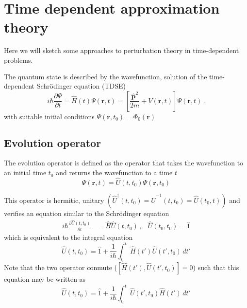 \chapter{Time dependent approximation theory}
Here we will sketch some approaches to perturbation theory in time-dependent problems.

The quantum state is described by the wavefunction, solution of the time-dependent Schr\"{o}dinger equation (TDSE)
\begin{equation}\label{Q:td-tdse}
i \hbar \frac{\partial \Psi}{\partial t} = \hat{H}(t)  \Psi(\bm{r},t)= 
 \left[ \frac{\hat{\bm{p}}^{2}}{2 m} + V(\bm{r},t) \right]  \Psi(\bm{r},t) \,.
\end{equation}
with suitable initial conditions $\Psi(\bm{r},t_{0})= \Phi_{0}(\bm{r})$ 

\section{Evolution operator}
\label{S:evolution-operator}

The evolution operator is defined as the operator that takes the wavefunction to an initial time $t_{0}$ and returns the wavefunction to a time $t$
\begin{equation} \label{Q:td-defin-evolu-operat}
  \Psi(\bm{r},t)=  \hat{U}(t,t_{0}) \Psi(\bm{r},t_{0})
\end{equation}

This operator is hermitic, unitary $\left( \hat{U}^{\dag}(t,t_{0})= \hat{U}^{-1}(t,t_{0})= \hat{U}(t_{0},t) \right)$ and verifies an equation similar to the Schr\"{o}dinger equation
\begin{align}
  \label{Q:td-diffe-equat-opera-evolu}
  i\hbar \frac{\partial \hat{U}(t,t_{0})}{\partial t}&= \hat{H} \hat{U}(t,t_{0})\,, & \hat{U}(t_{0},t_{0})= \hat{1}
\end{align}
which is equivalent to the integral equation
\begin{equation}
  \label{Q:td-diffe-equat-opera-evolu-0}
  \hat{U}(t,t_{0}) = \hat{1} + \frac{1}{i\hbar} \int_{t_{0}}^{t} \hat{H}(t') \hat{U}(t',t_{0}) \, dt'
\end{equation}
Note that the two operator conmute ($[\hat{H}(t') , \hat{U}(t',t_{0})]=0$) such that this equation may be written as
\begin{equation}
  \label{Q:td-diffe-equat-opera-evolu-1}
  \hat{U}(t,t_{0}) = \hat{1} + \frac{1}{i\hbar} \int_{t_{0}}^{t}\hat{U}(t',t_{0})  \hat{H}(t') \, dt'
\end{equation}
